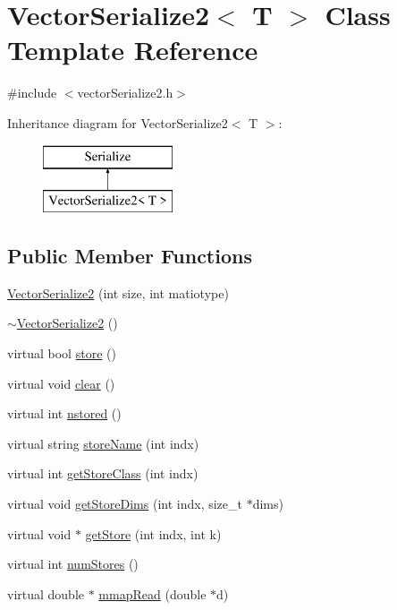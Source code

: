 \hypertarget{classVectorSerialize2}{\section{Vector\-Serialize2$<$ T $>$ Class Template Reference}
\label{classVectorSerialize2}
}


{\ttfamily \#include $<$vector\-Serialize2.\-h$>$}

Inheritance diagram for Vector\-Serialize2$<$ T $>$\-:\begin{figure}[H]
\begin{center}
\leavevmode
\includegraphics[height=2.000000cm]{classVectorSerialize2}
\end{center}
\end{figure}
\subsection*{Public Member Functions}
\begin{DoxyCompactItemize}
\item 
\hyperlink{classVectorSerialize2_a520cb274e3c0badadd9b95be911ee9a3}{Vector\-Serialize2} (int size, int matiotype)
\item 
\hyperlink{classVectorSerialize2_abf91742790ac898a87b68fd44ed1d70e}{$\sim$\-Vector\-Serialize2} ()
\item 
virtual bool \hyperlink{classVectorSerialize2_a720a62d5c2eb1299d445b35080662aaf}{store} ()
\item 
virtual void \hyperlink{classVectorSerialize2_ae8029b8225cbc4f9e07051949563e473}{clear} ()
\item 
virtual int \hyperlink{classVectorSerialize2_ab73b56a93e5d7ebba81727a16a5f2179}{nstored} ()
\item 
virtual string \hyperlink{classVectorSerialize2_ae0a636c3231b336b7dc8a9b2958b6b0e}{store\-Name} (int indx)
\item 
virtual int \hyperlink{classVectorSerialize2_acc7178f7f25ba6c275041a0e530befdb}{get\-Store\-Class} (int indx)
\item 
virtual void \hyperlink{classVectorSerialize2_a0377d72ce381217f8e8d250509226aec}{get\-Store\-Dims} (int indx, size\-\_\-t $\ast$dims)
\item 
virtual void $\ast$ \hyperlink{classVectorSerialize2_a856c33259537f46fe8c579bd6532a3f4}{get\-Store} (int indx, int k)
\item 
virtual int \hyperlink{classVectorSerialize2_a79c978e6e087c1e7bc398f678d2e943f}{num\-Stores} ()
\item 
virtual double $\ast$ \hyperlink{classVectorSerialize2_a8f4bf0a524b34b584d131b8fbfcd8d30}{mmap\-Read} (double $\ast$d)
\end{DoxyCompactItemize}
